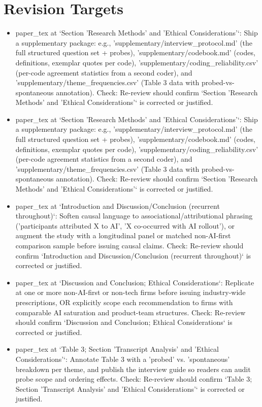 \documentclass[11pt]{article}
\begin{document}
\section*{Revision Targets}
\begin{itemize}[leftmargin=*]
  \item [open] paper\_tex at `Section 'Research Methods' and 'Ethical Considerations'`: Ship a supplementary package: e.g., 'supplementary/interview\_protocol.md' (the full structured question set + probes), 'supplementary/codebook.md' (codes, definitions, exemplar quotes per code), 'supplementary/coding\_reliability.csv' (per-code agreement statistics from a second coder), and 'supplementary/theme\_frequencies.csv' (Table 3 data with probed-vs-spontaneous annotation). Check: Re-review should confirm `Section 'Research Methods' and 'Ethical Considerations'` is corrected or justified.
  \item [open] paper\_tex at `Section 'Research Methods' and 'Ethical Considerations'`: Ship a supplementary package: e.g., 'supplementary/interview\_protocol.md' (the full structured question set + probes), 'supplementary/codebook.md' (codes, definitions, exemplar quotes per code), 'supplementary/coding\_reliability.csv' (per-code agreement statistics from a second coder), and 'supplementary/theme\_frequencies.csv' (Table 3 data with probed-vs-spontaneous annotation). Check: Re-review should confirm `Section 'Research Methods' and 'Ethical Considerations'` is corrected or justified.
  \item [open] paper\_tex at `Introduction and Discussion/Conclusion (recurrent throughout)`: Soften causal language to associational/attributional phrasing ('participants attributed X to AI', 'X co-occurred with AI rollout'), or augment the study with a longitudinal panel or matched non-AI-first comparison sample before issuing causal claims. Check: Re-review should confirm `Introduction and Discussion/Conclusion (recurrent throughout)` is corrected or justified.
  \item [open] paper\_tex at `Discussion and Conclusion; Ethical Considerations`: Replicate at one or more non-AI-first or non-tech firms before issuing industry-wide prescriptions, OR explicitly scope each recommendation to firms with comparable AI saturation and product-team structures. Check: Re-review should confirm `Discussion and Conclusion; Ethical Considerations` is corrected or justified.
  \item [open] paper\_tex at `Table 3; Section 'Transcript Analysis' and 'Ethical Considerations'`: Annotate Table 3 with a 'probed' vs. 'spontaneous' breakdown per theme, and publish the interview guide so readers can audit probe scope and ordering effects. Check: Re-review should confirm `Table 3; Section 'Transcript Analysis' and 'Ethical Considerations'` is corrected or justified.

\end{itemize}
\end{document}
